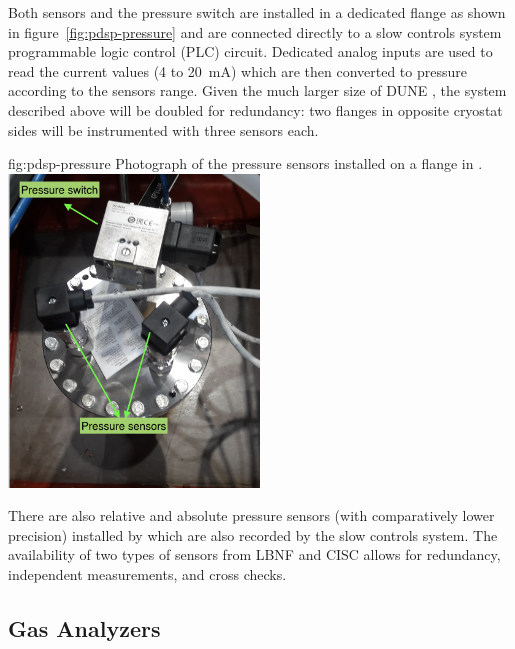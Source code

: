Both sensors and the pressure switch are installed in a dedicated flange as shown in figure~\ref{fig:pdsp-pressure} and are connected directly to a slow controls system programmable logic control (PLC) circuit. Dedicated analog inputs are used to read the current values (4 to 20~mA) which are then converted to pressure according to the sensors range. Given the much larger size of DUNE , the system described above will be doubled for redundancy: two flanges in opposite cryostat sides will be instrumented with three sensors each. 

\begin{dunefigure}{fig:pdsp-pressure}
  {Photograph of the pressure sensors installed on a flange in .}
  \includegraphics[width=0.5\textwidth]{graphics/cisc-pdsp-pressure-meters}
\end{dunefigure}

There are also relative and absolute pressure sensors (with comparatively lower precision) installed by  which are also recorded by the slow controls system. %
The availability of two types of sensors from LBNF and CISC allows for redundancy, independent measurements, and cross checks.

\subsection{Gas Analyzers}
\label{sec:fdgen-slow-cryo-gas-anlyz}

